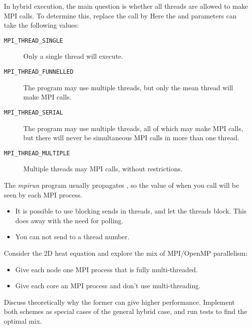 In hybrid execution, the main question is whether all threads
are allowed to make MPI calls. To determine this,
replace the  call by
%
%
Here the  and  parameters can take the following
values:
\begin{description}
\item[\texttt{MPI\_THREAD\_SINGLE}] Only a
  single thread will execute.
\item[\texttt{MPI\_THREAD\_FUNNELLED}]
  The program may use multiple threads, but only the mean thread will
  make MPI calls.
\item[\texttt{MPI\_THREAD\_SERIAL}] The
  program may use multiple threads, all of which may make MPI calls,
  but there will never be simultaneous MPI calls in more than one
  thread.
\item[\texttt{MPI\_THREAD\_MULTIPLE}]Multiple
  threads may MPI calls, without restrictions.
\end{description}

The \emph{mpirun}
program usually propagates ,
so the value of  when you call 
will be seen by each MPI process.

\begin{itemize}
\item It is possible to use blocking sends in threads, and let the
  threads block. This does away with the need for polling.
\item You can not send to a thread number.
\end{itemize}

\begin{exercise}
Consider the 2D heat equation and explore the mix of MPI/OpenMP
parallelism:
\begin{itemize}
\item Give each node one MPI process that is fully multi-threaded.
\item Give each core an MPI process and don't use multi-threading.
\end{itemize}
Discuss theoretically why the former can give higher performance.
Implement both schemes as special cases of the general hybrid case,
and run tests to find the optimal mix.
\end{exercise}
